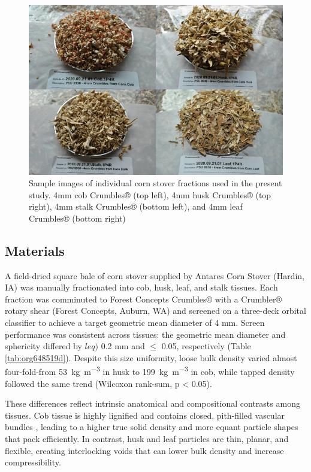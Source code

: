 \documentclass[xcolor=dvipsnames,10pt,hidelinks]{article}
\let\oldsubsection\subsection
\renewcommand{\subsection}{\clearpage\oldsubsection}
\begin{document}
\begin{figure}[htbp]
\centering
\includegraphics[width=.9\linewidth]{figures/image2.png}
\caption{\label{fig:org7c3c347}Sample images of individual corn stover fractions used in the present study. 4mm cob Crumbles® (top left), 4mm husk Crumbles® (top right), 4mm stalk Crumbles® (bottom left), and 4mm leaf Crumbles® (bottom right)}
\end{figure}
\subsection{Materials}
\label{sec:org22479dd}
A field-dried square bale of corn stover supplied by Antares Corn Stover (Hardin, IA) was manually fractionated into cob, husk, leaf, and stalk tissues.
Each fraction was comminuted to Forest Concepts Crumbles® with a Crumbler® rotary shear (Forest Concepts, Auburn, WA) and
screened on a three-deck orbital classifier to achieve a target geometric mean diameter of 4 mm.
Screen performance was consistent across tissues:
the geometric mean diameter and sphericity differed by \(leq)\) 0.2 mm and \(\leq\) 0.05, respectively (Table \ref{tab:org648519d}).
Despite this size uniformity, loose bulk density varied almost four-fold-from \qty{53}{\kilo\gram\per\cubic\meter} in husk
to \qty{199}{\kilo\gram\per\cubic\meter} in cob, while tapped density followed the same trend (Wilcoxon rank-sum, p < 0.05).

These differences reflect intrinsic anatomical and compositional contrasts among tissues.
Cob tissue is highly lignified \parencite{berchem_corn_2017} and contains closed, pith-filled vascular bundles \parencite{thornburg_mass_2022},
leading to a higher true solid density and more equant particle shapes that pack efficiently.
In contrast, husk and leaf particles are thin, planar, and flexible, creating interlocking voids \parencite{thornburg_mass_2022,li_characterization_2020} that
can lower bulk density and increase compressibility.
\end{document}

